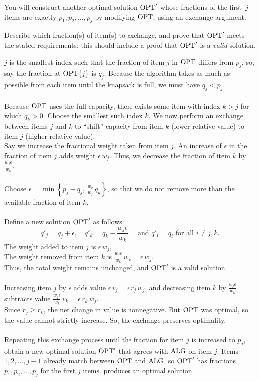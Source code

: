 \documentclass[11pt,addpoints,answers]{exam}
\begin{document}
\begin{questions}
\begin{parts}
    You will construct another optimal solution $\text{OPT}'$ whose fractions of the first~$j$ items are exactly $p_1,p_2,\ldots,p_j$ by modifying $\text{OPT}$, using an exchange argument.

    Describe which fraction(s) of item(s) to exchange, and prove that $\text{OPT}'$ meets the stated requirements; this should include a proof that $\text{OPT}'$ is a \emph{valid} solution.
    
    \begin{solution}
      $j$ is the smallest index such that the fraction of item $j$ in $\text{OPT}$ differs from $p_j$, so, say the fraction at $\text{OPT}\{j\}$ is $q_j$. Because the algorithm takes as much as possible from each item until the knapsack is full, we must have $q_j < p_j$.\\
      \\
      Because $\text{OPT}$ uses the full capacity, there exists some item with index $k > j$ for which $q_k > 0$. Choose the smallest such index $k$. We now perform an exchange between items $j$ and $k$ to “shift” capacity from item $k$ (lower relative value) to item $j$ (higher relative value).
      \\
      Say we increase the fractional weight taken from item $j$. An increase of $\epsilon$ in the fraction of item $j$ adds weight $\epsilon\,w_j$. Thus, we decrease the fraction of item $k$ by $\frac{w_j\epsilon}{w_k}$.\\
      \\
      Choose $\epsilon = \min\left\{p_j - q_j,\, \frac{w_k}{w_j}\,q_k\right\}$, so that we do not remove more than the available fraction of item $k$. \\
      \\
      Define a new solution $\text{OPT}'$ as follows:
      \[
      q'_j = q_j + \epsilon,\quad q'_k = q_k - \frac{w_j\epsilon}{w_k},\quad \text{and } q'_i = q_i \text{ for all } i \neq j,k.
      \]
      The weight added to item $j$ is $\epsilon\,w_j$,\\
      The weight removed from item $k$ is $\frac{w_j\epsilon}{w_k}\,w_k = \epsilon\,w_j$.\\
      Thus, the total weight remains unchanged, and $\text{OPT}'$ is a valid solution.\\
      \\
      Increasing item $j$ by $\epsilon$ adds value $\epsilon\,v_j = \epsilon\,r_j\,w_j$, and decreasing item $k$ by $\frac{w_j\epsilon}{w_k}$ subtracts value $\frac{w_j\epsilon}{w_k}\,v_k = \epsilon\,r_k\,w_j$. \\
      Since $r_j \ge r_k$, the net change in value is nonnegative. But $\text{OPT}$ was optimal, so the value cannot strictly increase. So, the exchange preserves optimality. \\
      \\
      Repeating this exchange process until the fraction for item $j$ is increased to $p_j$, obtain a new optimal solution $\text{OPT}'$ that agrees with $\text{ALG}$ on item $j$. Items $1,2,\ldots,j-1$ already match between $\text{OPT}$ and $\text{ALG}$, so $\text{OPT}'$ has fractions $p_1,p_2,\ldots,p_j$ for the first $j$ items.  produces an optimal solution.
    \end{solution}
      


\end{parts}
\end{questions}
\end{document}
